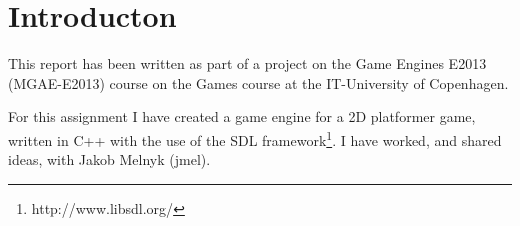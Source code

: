 \section{Introducton}
\label{01}

This report has been written as part of a project on the Game Engines E2013 (MGAE-E2013) course on the Games course at the IT-University of Copenhagen.

For this assignment I have created a game engine for a 2D platformer game, written in C++ with the use of the SDL framework\footnote{http://www.libsdl.org/}. I have worked, and shared ideas, with Jakob Melnyk (jmel).